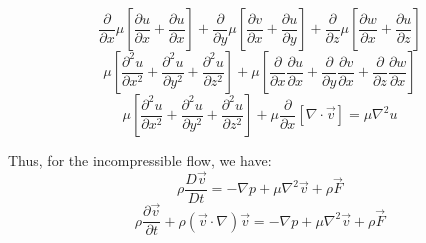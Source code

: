 \documentclass[11pt]{article} %
\begin{document}
$$
\frac{\partial }{\partial x}\mu \left[\frac{\partial u}{\partial x}+\frac{\partial u}{\partial x} \right]+\frac{\partial }{\partial y}\mu \left[\frac{\partial v}{\partial x}+\frac{\partial u}{\partial y} \right] + \frac{\partial }{\partial z}\mu \left[\frac{\partial w}{\partial x}+\frac{\partial u}{\partial z} \right]
$$
$$
\mu \left[\frac{\partial^{2} u}{\partial x^{2}} + \frac{\partial^{2} u}{\partial y^{2}}+\frac{\partial^{2} u}{\partial z^{2}}  \right]+\mu\left[\frac{\partial }{\partial x}\frac{\partial u}{\partial x}+\frac{\partial }{\partial y}\frac{\partial v}{\partial x} +\frac{\partial }{\partial z}\frac{\partial w}{\partial x}\right]
$$
$$
\mu \left[\frac{\partial^{2} u}{\partial x^{2}} + \frac{\partial^{2} u}{\partial y^{2}}+\frac{\partial^{2} u}{\partial z^{2}}  \right]+\mu\frac{\partial }{\partial x}\left[\nabla \cdot \vec{v}  \right]=\mu \nabla^{2}u
$$\par 
Thus, for the incompressible flow, we have:
\begin{equation}
\rho \frac{D \vec{v}}{Dt} = -\nabla p + \mu \nabla^{2}\vec{v} +\rho \vec{F}
\end{equation}
\begin{equation}
\rho \frac{\partial \vec{v}}{\partial t} + {\rho (\vec{v} \cdot \nabla)\vec{v}} = -\nabla p + \mu \nabla^{2}\vec{v} +\rho \vec{F}
\end{equation}
\vspace{2cm}
\end{document}
